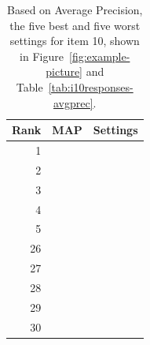 \begin{table}[htb!]
\begin{center}
\begin{tabular}{|r|l|c|}
\hline
Rank & MAP & Settings \\
\hline
\hline
1 &  &  \\
\hline
2 &  &  \\
\hline
3 &  &  \\
\hline
4 &  &  \\
\hline
5 &  &  \\
\hline
\hline
26 &  &  \\
\hline
27 &  &  \\
\hline
28 &  &  \\
\hline
29 &  &  \\
\hline
30 &  &  \\
\hline
\end{tabular}
\caption{Based on Average Precision, the five best and five worst settings for item 10, shown in Figure~\ref{fig:example-picture} and Table~\ref{tab:i10responses-avgprec}.}
\label{tab:i10-dist-ranked-settings}
\end{center}
\end{table}

